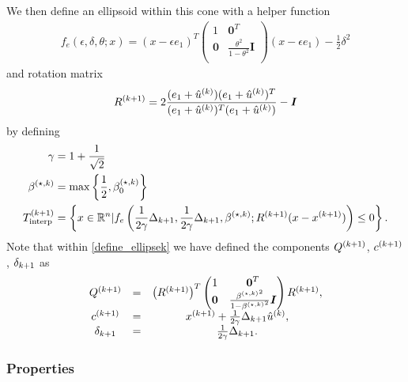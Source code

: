 We then define an ellipsoid within this cone with a helper function
\begin{align}
f_e(\epsilon, \delta, \theta; x) = (x - \epsilon e_1)^T\begin{pmatrix}
1 & \boldsymbol0^T \\
\boldsymbol 0 & \frac{\theta^2}{1 - \theta^2} \boldsymbol I \\
\end{pmatrix}(x - \epsilon e_1) - \frac 1 2 \delta^2 \label{define_ellipse_function}
\end{align}
and rotation matrix
\begin{align}
{R^{(k+1)}} = 2\frac{(e_1 + {{\hat u}^{(k)}})(e_1 + {{\hat u}^{(k)}})^T}{(e_1 + {{\hat u}^{(k)}})^T(e_1 + {{\hat u}^{(k)}})} - \boldsymbol I \label{define_rotation}
\end{align}
by defining
\begin{align}
\gamma &= 1 + \frac 1 {\sqrt{2}} \label{define_the_constant_gamma} \\
{\beta^{(\star, k)}} &= \max\left\{\frac 1 2 , {\beta_0^{(\star, k)}}\right\} \label{define_bs} \\
{T_{\text{interp}}^{(k+1)}} &= \left\{x \in \mathbb R^n | f_e\left(\frac 1 {2\gamma} \Delta_{k+1}, \frac 1 {2\gamma} \Delta_{k+1},{\beta^{(\star, k)}}; {R^{(k+1)}}(x - {{x}^{(k+1)}})\right) \le 0\right\}. \label{define_ellipsek}
\end{align}
Note that within \cref{define_ellipsek} we have defined the components ${Q^{(k+1)}}$, ${c^{(k+1)}}$, ${\delta_{k+1}}$ as
\begin{align}
\begin{array}{ccc}
{Q^{(k+1)}} &=& \left({R^{(k+1)}}\right)^T \begin{pmatrix}
1 & \boldsymbol0^T \\
\boldsymbol 0 & \frac{{\beta^{(\star, k)}}^2}{1 - {\beta^{(\star, k)}}^2} \boldsymbol I \\
\end{pmatrix} {R^{(k+1)}}, \\
{c^{(k+1)}} &=& {{x}^{(k+1)}} + \frac 1 {2\gamma} \Delta_{k+1} {{\hat u}^{(k)}}, \\
{\delta_{k+1}} &=& \frac 1 {2\gamma} \Delta_{k+1}. 
\end{array}\label{conservative_ellipsoid_details}
\end{align}


\subsubsection{Properties}
\label{feasible_ellipsoid_analysis}

